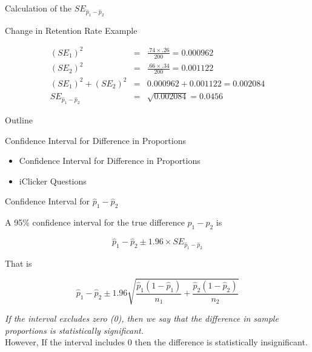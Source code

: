 \documentclass[14pt]{beamer}\usepackage[]{graphicx}\usepackage[]{color}
\begin{document}
\begin{frame}[fragile]{Calculation of the $SE_{\hat{p}_1 - \hat{p}_2}$}

Change in Retention Rate Example

\begin{eqnarray*}
(SE_1)^2 &=& \frac{.74 \times .26}{200} = 0.000962 \\
(SE_2)^2 &=& \frac{.66 \times .34}{200} = 0.001122 \\
(SE_1)^2 + (SE_2)^2 &=& 0.000962 + 0.001122 = 0.002084 \\
SE_{ \hat{p}_1 - \hat{p}_2} &=& \sqrt{0.002084} = 0.0456
\end{eqnarray*}
\end{frame}

\begin{frame}[fragile]{Outline}

Confidence Interval for Difference in Proportions  

\begin{itemize}
\item Confidence Interval for Difference in Proportions  
\item iClicker Questions
\end{itemize}

\end{frame}

\begin{frame}[fragile]{Confidence Interval for $\hat{p}_1 - \hat{p}_2$}

{\small{
A 95\% confidence interval for the true difference $p_1 - p_2$ is

$$\hat{p}_1 - \hat{p}_2 \pm 1.96 \times SE_{ \hat{p}_1 - \hat{p}_2}$$

That is 

$$\hat{p}_1 - \hat{p}_2 \pm 1.96 \sqrt{ \frac{\hat{p}_1 (1-\hat{p}_1)}{n_1} + \frac{\hat{p}_2 (1-\hat{p}_2)}{n_2}}$$

\textit{If the interval excludes zero (0), then we say that the difference in sample proportions is statistically significant.} \\ However, If the interval includes 0 then the difference is statistically insignificant.
}}
\end{frame}
\end{document}
